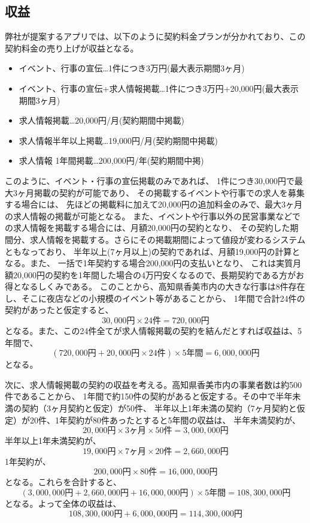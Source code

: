 \documentclass[a4paper,dvipdfmx]{jarticle}
\begin{document}
\subsection{収益}
弊社が提案するアプリでは、以下のように契約料金プランが分かれており、この契約料金の売り上げが収益となる。
\begin{itemize}
    \item イベント、行事の宣伝…1件につき3万円(最大表示期間3ヶ月)
    \item イベント、行事の宣伝+求人情報掲載…1件につき3万円+20,000円(最大表示期間3ヶ月)
    \item 求人情報掲載…20,000円/月(契約期間中掲載)
    \item 求人情報半年以上掲載…19,000円/月(契約期間中掲載)
    \item 求人情報 1年間掲載…200,000円/年(契約期間中掲)
\end{itemize}
このように、イベント・行事の宣伝掲載のみであれば、
1件につき30,000円で最大3ヶ月掲載の契約が可能であり、
その掲載するイベントや行事での求人を募集する場合には、
先ほどの掲載料に加えて20,000円の追加料金のみで、最大3ヶ月の求人情報の掲載が可能となる。
また、イベントや行事以外の民営事業などでの求人情報を掲載する場合には、月額20,000円の契約となり、
その契約した期間分、求人情報を掲載する。さらにその掲載期間によって値段が変わるシステムともなっており、
半年以上(7ヶ月以上)の契約であれば、月額19,000円の計算となる。また、
一括で1年契約する場合200,000円の支払いとなり、
これは実質月額20,000円の契約を1年間した場合の4万円安くなるので、長期契約である方がお得となるしくみである。
このことから、高知県香美市内の大きな行事は8件存在し、そこに夜店などの小規模のイベント等があることから、
1年間で合計24件の契約があったと仮定すると、
$$
    30,000円 \times 24件 = 720,000円
$$
となる。また、この24件全てが求人情報掲載の契約を結んだとすれば収益は、5年間で、
$$
    (720,000円 + 20,000円 \times 24件) \times 5年間 = 6,000,000円
$$
となる。

次に、求人情報掲載の契約の収益を考える。高知県香美市内の事業者数は約500件であることから、
1年間で約150件の契約があると仮定する。その中で半年未満の契約（3ヶ月契約と仮定）が50件、
半年以上1年未満の契約（7ヶ月契約と仮定）が20件、1年契約が80件あったとすると5年間の収益は、
半年未満契約が、
$$
    20,000円 \times 3ヶ月 \times 50件 = 3,000,000円
$$
半年以上1年未満契約が、
$$
    19,000円 \times 7ヶ月 \times 20件 = 2,660,000円
$$
1年契約が、
$$
    200,000円 \times 80件 = 16,000,000円
$$
となる。これらを合計すると、
$$
    (3,000,000円 + 2,660,000円 + 16,000,000円) \times 5年間 = 108,300,000円
$$
となる。よって全体の収益は、
$$
    108,300,000円 + 6,000,000円 = 114,300,000円
$$
\clearpage
\end{document}
